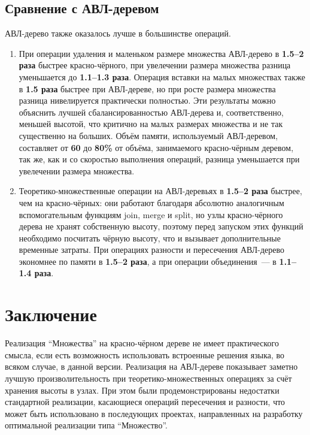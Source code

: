 \documentclass[a4paper]{article}
\begin{document}
\subsection{Сравнение с АВЛ-деревом}
АВЛ-дерево также оказалось лучше в большинстве операций.
\begin{enumerate}
    \item При операции удаления и маленьком размере множества АВЛ-дерево в \textbf{1.5--2 раза} быстрее красно-чёрного, при увелечении размера множества 
    разница уменьшается до \textbf{1.1--1.3 раза}. Операция вставки на малых множествах также в \textbf{1.5 раза} быстрее при АВЛ-дереве, но при росте 
    размера множества разница нивелируется практически полностью. Эти результаты можно объяснить лучшей сбалансированностью АВЛ-дерева и, соответственно,
    меньшей высотой, что критично на малых размерах множества и не так существенно на больших.
    Объём памяти, используемый АВЛ-деревом, составляет от \textbf{60} до \textbf{80\%}  от объёма, занимаемого красно-чёрным деревом, так же, как и со
    скоростью выполнения операций, разница уменьшается при увелечении размера множества.
    \item Теоретико-множественные операции на АВЛ-деревьях в \textbf{1.5--2 раза} быстрее, чем на красно-чёрных: они работают благодаря абсолютно 
    аналогичным вспомогательным функциям join, merge и split, но узлы красно-чёрного дерева не хранят собственную высоту, поэтому перед запуском этих 
    функций необходимо посчитать чёрную высоту, что и вызывает дополнительные временные затраты.
    При операциях разности и пересечения АВЛ-дерево экономнее по памяти в \textbf{1.5--2 раза}, а при операции объединения~--- в \textbf{1.1--1.4 раза}.
\end{enumerate}

\section{Заключение}

Реализация \enquote{Множества} на красно-чёрном дереве не имеет практического смысла, если есть возможность использовать встроенные решения языка, 
во всяком случае, в данной версии. Реализация на АВЛ-дереве показывает заметно лучшую произволительность при теоретико-множественных операциях за счёт 
хранения высоты в узлах.
При этом были продемонстрированы недостатки стандартной реализации, касающиеся операций пересечения и разности, 
что может быть использовано в последующих проектах, направленных на разработку оптимальной реализации типа \enquote{Множество}. 
\end{document}
